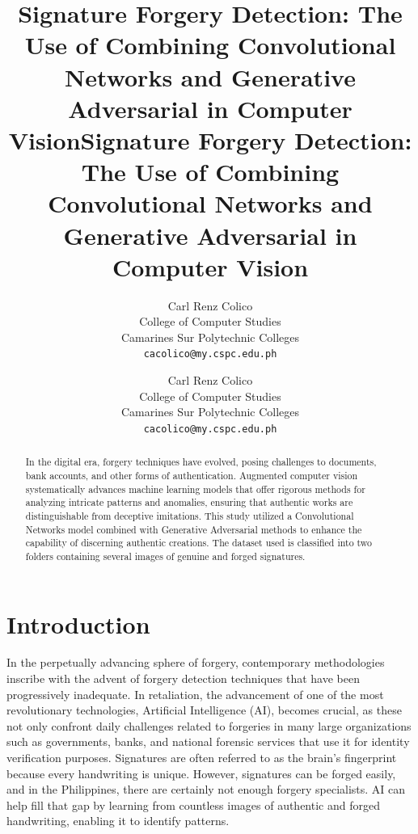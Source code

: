 \documentclass[12pt]{article}
\title{\textbf{Signature Forgery Detection: The Use of Combining Convolutional Networks and Generative Adversarial in Computer Vision}}
\author{Carl Renz Colico \\ College of Computer Studies \\ Camarines Sur Polytechnic Colleges \\ \texttt{cacolico@my.cspc.edu.ph}}
\begin{document}
\title{\textbf{Signature Forgery Detection: The Use of Combining Convolutional Networks and Generative Adversarial in Computer Vision}}
\author{Carl Renz Colico \\ College of Computer Studies \\ Camarines Sur Polytechnic Colleges \\ \texttt{cacolico@my.cspc.edu.ph}}

\maketitle



\begin{abstract}
In the digital era, forgery techniques have evolved, posing challenges to documents, bank accounts, and other forms of authentication. Augmented computer vision systematically advances machine learning models that offer rigorous methods for analyzing intricate patterns and anomalies, ensuring that authentic works are distinguishable from deceptive imitations. This study utilized a Convolutional Networks model combined with Generative Adversarial methods to enhance the capability of discerning authentic creations. The dataset used is classified into two folders containing several images of genuine and forged signatures.
\end{abstract}

\section{Introduction}
In the perpetually advancing sphere of forgery, contemporary methodologies inscribe with the advent of forgery detection techniques that have been progressively inadequate. In retaliation, the advancement of one of the most revolutionary technologies, Artificial Intelligence (AI), becomes crucial, as these not only confront daily challenges related to forgeries in many large organizations such as governments, banks, and national forensic services that use it for identity verification purposes. Signatures are often referred to as the brain’s fingerprint because every handwriting is unique. However, signatures can be forged easily, and in the Philippines, there are certainly not enough forgery specialists. AI can help fill that gap by learning from countless images of authentic and forged handwriting, enabling it to identify patterns.
\end{document}

